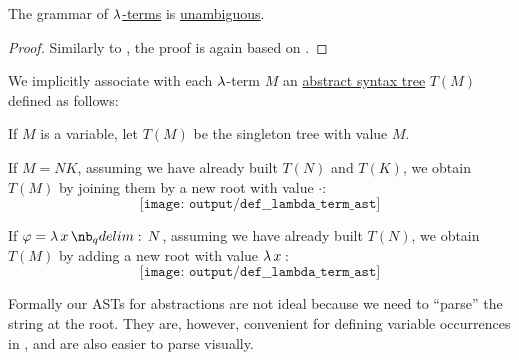 \begin{proposition}\label{thm:lambda_terms_are_unambiguous}
  The grammar of \hyperref[def:lambda_term]{\( \mathrm{\lambda} \)-terms} is \hyperref[def:grammar_ambiguity]{unambiguous}.
\end{proposition}
\begin{proof}
  Similarly to , the proof is again based on .
\end{proof}

\begin{definition}\label{def:lambda_term_ast}
  We implicitly associate with each \( \mathrm{\lambda} \)-term \( M \) an \hyperref[con:abstract_syntax_tree]{abstract syntax tree} \( T(M) \) defined as follows:
  \begin{thmenum}
     If \( M \) is a variable, let \( T(M) \) be the singleton tree with value \( M \).

     If \( M = NK \), assuming we have already built \( T(N) \) and \( T(K) \), we obtain \( T(M) \) by joining them by a new root with value \( \cdot \):
    \begin{equation*}
      \texttt{[image: output/def\_\_lambda\_term\_ast]}
    \end{equation*}

     If \( \varphi = \qabs x N \), assuming we have already built \( T(N) \), we obtain \( T(M) \) by adding a new root with value \( \qabs* x \):
    \begin{equation*}
      \texttt{[image: output/def\_\_lambda\_term\_ast]}
    \end{equation*}
  \end{thmenum}
\end{definition}
\begin{comments}
  \item Formally our ASTs for abstractions are not ideal because we need to \enquote{parse} the string at the root. They are, however, convenient for defining variable occurrences in , and are also easier to parse visually.
\end{comments}


